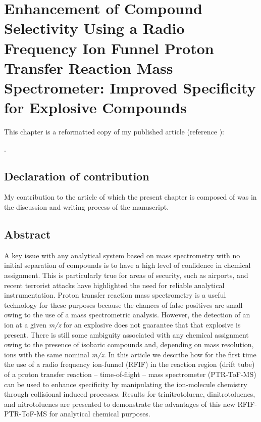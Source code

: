 \chapter{Enhancement of Compound Selectivity Using a Radio Frequency Ion Funnel Proton Transfer Reaction Mass Spectrometer: Improved
Specificity for Explosive Compounds}\label{chapter:RF}


This chapter is a reformatted copy of my published article (reference \cite{RF_TNT}):

.








\section*{Declaration of contribution}
My contribution to the article of which the present chapter is composed of was
in the discussion and writing process of the manuscript. 

\section{Abstract}
A key issue with any analytical system based on mass spectrometry with no initial separation of compounds is to have a high level of confidence in chemical assignment. This is particularly true for areas of security, such as airports, and recent terrorist attacks have highlighted the need for reliable analytical instrumentation. Proton transfer reaction mass spectrometry is a useful technology for these purposes because the chances of false positives are small owing to the use of a mass spectrometric analysis. However, the detection of an ion at a given \textit{m/z} for an explosive does not guarantee that that explosive is present. There is still some ambiguity associated with any chemical assignment owing to the presence of isobaric compounds and, depending on mass resolution, ions with the same nominal \textit{m/z}. In this article we describe how for the first time the use of a radio frequency ion-funnel (RFIF) in the reaction region (drift tube) of a proton transfer reaction -- time-of-flight -- mass spectrometer (PTR-ToF-MS) can be used to enhance specificity by manipulating the ion-molecule chemistry through collisional induced processes. Results for trinitrotoluene, dinitrotoluenes, and nitrotoluenes are presented to demonstrate the advantages of this new RFIF-PTR-ToF-MS for analytical chemical purposes.

